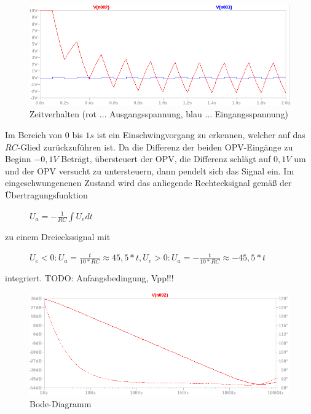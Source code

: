 \documentclass[12pt,a4paper,titlepage]{article}
\begin{document}
\begin{figure}[H]
  \centering
  \includegraphics[width=150mm]{integrierer_transient.png}
  \caption{Zeitverhalten (rot $\hdots$ Ausgangsspannung, blau $\hdots$ Eingangsspannung)}
\end{figure}
Im Bereich von $0$ bis $1s$ ist ein Einschwingvorgang zu erkennen, welcher auf das $RC$-Glied zur\"uckzuf\"uhren ist. Da die Differenz der beiden OPV-Eing\"ange zu Beginn $-0,1V$ Betr\"agt, \"ubersteuert der OPV, die Differenz schl\"agt auf $0,1V$ um und der OPV versucht zu untersteuern, dann pendelt sich das Signal ein. Im eingeschwungenenen Zustand wird das anliegende Rechtecksignal gem\"aß der \"Ubertragungsfunktion

\begin{figure}[H]
  \centering
  $U_a = -\frac{1}{RC}\int U_e dt$
\end{figure}

\noindent zu einem Dreieckssignal mit

\begin{figure}[H]
  \centering
  $U_e<0: U_a = \frac{t}{10*RC} \approx 45,5*t, U_e>0: U_a = -\frac{t}{10*RC} \approx -45,5*t$
\end{figure}

\noindent integriert. TODO: Anfangsbedingung, Vpp!!!


\begin{figure}[H]
  \centering
  \includegraphics[width=150mm]{integrierer_bode.png}
  \caption{Bode-Diagramm}
\end{figure}
\end{document}
